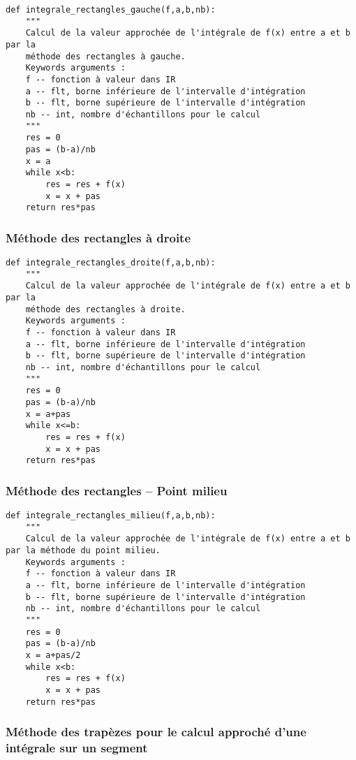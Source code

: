 \begin{lstlisting}
def integrale_rectangles_gauche(f,a,b,nb):
    """
    Calcul de la valeur approchée de l'intégrale de f(x) entre a et b par la 
    méthode des rectangles à gauche.
    Keywords arguments :
    f -- fonction à valeur dans IR
    a -- flt, borne inférieure de l'intervalle d'intégration
    b -- flt, borne supérieure de l'intervalle d'intégration
    nb -- int, nombre d'échantillons pour le calcul
    """
    res = 0
    pas = (b-a)/nb
    x = a
    while x<b:
        res = res + f(x)
        x = x + pas
    return res*pas
\end{lstlisting}

\subsubsection{Méthode des rectangles à droite}

\begin{lstlisting}
def integrale_rectangles_droite(f,a,b,nb):
    """
    Calcul de la valeur approchée de l'intégrale de f(x) entre a et b par la 
    méthode des rectangles à droite.
    Keywords arguments :
    f -- fonction à valeur dans IR
    a -- flt, borne inférieure de l'intervalle d'intégration
    b -- flt, borne supérieure de l'intervalle d'intégration
    nb -- int, nombre d'échantillons pour le calcul
    """
    res = 0
    pas = (b-a)/nb
    x = a+pas
    while x<=b:
        res = res + f(x)
        x = x + pas
    return res*pas
\end{lstlisting}

\subsubsection{Méthode des rectangles -- Point milieu}
\begin{lstlisting}
def integrale_rectangles_milieu(f,a,b,nb):
    """
    Calcul de la valeur approchée de l'intégrale de f(x) entre a et b par la méthode du point milieu.
    Keywords arguments :
    f -- fonction à valeur dans IR
    a -- flt, borne inférieure de l'intervalle d'intégration
    b -- flt, borne supérieure de l'intervalle d'intégration
    nb -- int, nombre d'échantillons pour le calcul
    """
    res = 0
    pas = (b-a)/nb
    x = a+pas/2
    while x<b:
        res = res + f(x)
        x = x + pas
    return res*pas
\end{lstlisting}

\subsubsection{Méthode des trapèzes pour le calcul approché d'une intégrale sur un segment}

